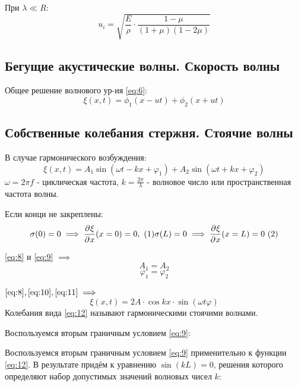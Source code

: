 \documentclass[a4paper,12pt]{article}
\numberwithin{equation}{section}
\begin{document}
При $\lambda \ll R$:
\[ u_i = \sqrt{\frac{E}{\rho} \cdot \frac{1-\mu}{(1+\mu)(1-2\mu)}} \]
\label{eq:ui}

\subsection{Бегущие акустические волны. Скорость волны}
Общее решение волнового ур-ия \eqref{eq:6}:
\begin{equation}
  \xi(x,t) = \phi_1(x-ut) + \phi_2(x+ut)
  \label{eq:7}
\end{equation}

\subsection{Собственные колебания стержня. Стоячие волны}
В случае гармонического возбуждения:
\begin{equation}
  \xi(x,t) = A_1 \sin{(\omega t - kx + \varphi_1)} + 
  A_2 \sin{(\omega t + kx + \varphi_2)}
  \label{eq:8}
\end{equation}
$\omega = 2\pi f$ - циклическая частота, 
$k = \frac{2\pi}{\lambda}$ - волновое число или пространственная частота волны.

Если конци не закреплены:
\begin{equation}
  \sigma(0) = 0 \implies \partderiv{\xi}{x} (x = 0) = 0,\ (1)
  \sigma(L) = 0 \implies \partderiv{\xi}{x} (x = L) = 0\ (2) 
  \label{eq:9}
\end{equation}

\eqref{eq:8} и \eqref{eq:9} $\implies$
\begin{equation}
  A_1 = A_2 \label{eq:10}
\end{equation}
\begin{equation}
  \varphi_1 = \varphi_2 \label{eq:11}
\end{equation}

$\eqref{eq:8}, \eqref{eq:10}, \eqref{eq:11} \implies$
\begin{equation}
  \xi(x,t) = 2A \cdot \cos{kx} \cdot \sin{(\omega t \varphi)}
  \label{eq:12}
\end{equation}
Колебания вида \eqref{eq:12} называют гармоническими стоячими волнами.

Воспользуемся вторым граничным условием \eqref{eq:9}:

Воспользуемся вторым граничным условием \eqref{eq:9} применительно к функции \eqref{eq:12}. В результате придём к уравнению $\sin(kL) = 0$, решения которого определяют набор допустимых значений волновых чисел $k$:
\end{document}
